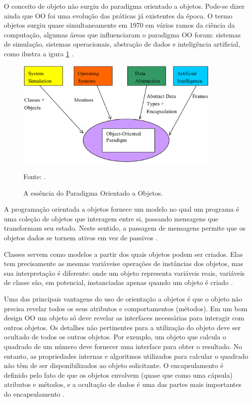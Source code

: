 O conceito de objeto não surgiu do paradigma orientado a objetos. Pode-se dizer ainda que OO foi uma evolução das práticas já existentes da época. O termo objetos surgiu quase simultaneamente em 1970 em vários ramos da ciência da computação, algumas áreas que influenciaram o paradigma OO foram: sistemas de simulação, sistemas operacionais, abstração de dados e inteligência artificial, como ilustra a igura \ref{essenciaOO} \cite[pág.~1]{capretz2003}.

\begin{figure}[H]
\centering
\includegraphics[width=0.9\textwidth]{figuras/essenciaOO}
\caption{A essência do Paradigma Orientado a Objetos.}{Fonte: .} 
\label{essenciaOO}
\end{figure}

A programação orientada a objetos fornece um modelo no qual um programa é uma coleção de objetos que interagem entre si, passando mensagens que transformam seu estado. Neste sentido, a passagem de mensagens permite que os objetos dados se tornem ativos em vez de passivos \cite[pág.~310]{tucker2009}.

Classes servem como modelos a partir dos quais objetos podem ser criados. Elas tem precisamente as mesmas variáveise operações de instâncias dos objetos, mas sua interpretação é diferente: onde um objeto representa variáveis reais, variáveis de classe são, em potencial, instanciadas apenas quando um objeto é criado  \cite[pág.~10]{wegner1990}.

Uma das principais vantagens do uso de orientação a objetos é que o objeto não precisa revelar todos os seus atributos e comportamentos (métodos). Em um bom design OO um objeto só deve revelar as interfaces necessárias para interagir com outros objetos. Os detalhes não pertinentes para a utilização do objeto deve ser ocultado de todos os outros objetos. Por exemplo, um objeto que calcula o quadrado de um número deve fornecer uma interface para obter o resultado. No entanto, as propriedades internas e algoritmos utilizados para calcular o quadrado não têm de ser disponibilizados ao objeto solicitante. O encapsulamento  é definido pelo fato de que os objetos envolvem (quase que como uma cápsula) atributos e métodos, e a ocultação de dados é uma das partes mais importantes do encapsulamento \cite[pág.~19]{weisfeld2009}.

